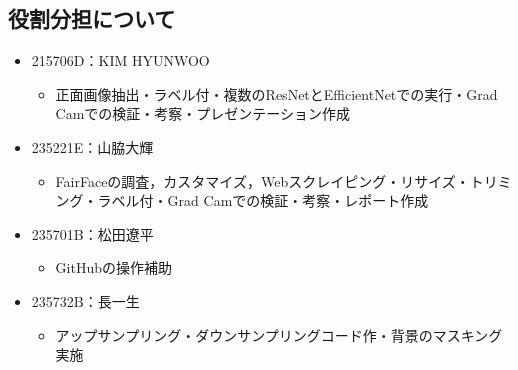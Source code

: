\documentclass[a4paper,11pt,titlepage]{jsarticle}
\begin{document}
\subsection{役割分担について}
\begin{itemize}
    \item 215706D：KIM HYUNWOO
        \begin{itemize}
            \item 正面画像抽出・ラベル付・複数のResNetとEfficientNetでの実行・Grad Camでの検証・考察・プレゼンテーション作成
        \end{itemize}
    \item 235221E：山脇大輝
        \begin{itemize}
            \item FairFaceの調査，カスタマイズ，Webスクレイピング・リサイズ・トリミング・ラベル付・Grad Camでの検証・考察・レポート作成
        \end{itemize}
    \item 235701B：松田遼平
        \begin{itemize}
            \item GitHubの操作補助
        \end{itemize}
    \item 235732B：長一生
        \begin{itemize}
            \item アップサンプリング・ダウンサンプリングコード作・背景のマスキング実施
        \end{itemize}
\end{itemize}

\end{document}
